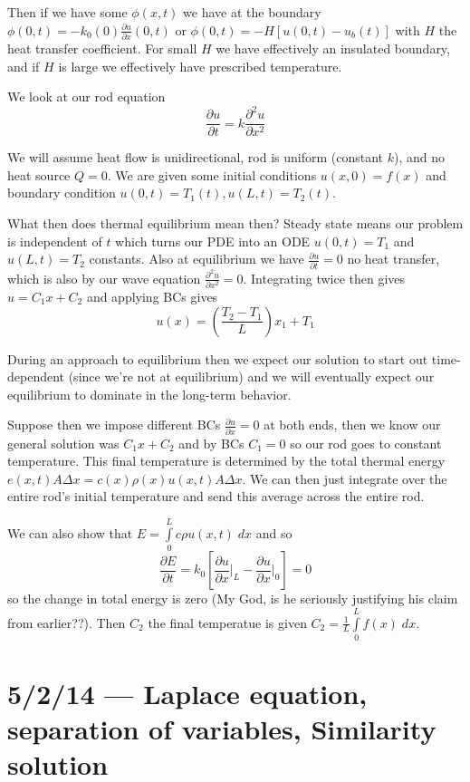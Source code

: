 \documentclass[10pt]{report}
\newcommand{\ptd}[2]{\frac{\partial^2 #1}{\partial#2^2}}
\newcommand{\pd}[2]{\frac{\partial #1}{\partial#2}}
\begin{document}
Then if we have some $\phi(x,t)$ we have at the boundary $\phi(0,t) = -k_0(0) \pd{u}{x}(0,t)$ or $\phi(0,t) = -H\left[ u(0,t) - u_b(t) \right]$ with $H$ the heat transfer coefficient. For small $H$ we have effectively an insulated boundary, and if $H$ is large we effectively have prescribed temperature. 

We look at our rod equation
\begin{equation}
    \pd{u}{t} = k\ptd{u}{x}
\end{equation}

We will assume heat flow is unidirectional, rod is uniform (constant $k$), and no heat source $Q = 0$. We are given some initial conditions $u(x,0) = f(x)$ and boundary condition $u(0,t) = T_1(t), u(L,t) = T_2(t)$.

What then does thermal equilibrium mean then? Steady state means our problem is independent of $t$ which turns our PDE into an ODE $u(0,t) = T_1$ and $u(L,t) = T_2$ constants. Also at equilibrium we have $\pd{u}{t} = 0$ no heat transfer, which is also by our wave equation $\ptd{u}{x} = 0$. Integrating twice then gives $u = C_1x + C_2$ and applying BCs gives 
\begin{equation}
    u(x) = \left( \frac{T_2 - T_1}{L} \right)x_1 + T_1
\end{equation}

During an approach to equilibrium then we expect our solution to start out time-dependent (since we're not at equilibrium) and we will eventually expect our equilibrium to dominate in the long-term behavior.

Suppose then we impose different BCs $\pd{u}{x} = 0$ at both ends, then we know our general solution was $C_1x + C_2$ and by BCs $C_1 = 0$ so our rod goes to constant temperature. This final temperature is determined by the total thermal energy $e(x,t)A\Delta x = c(x)\rho(x)u(x,t) A\Delta x$. We can then just integrate over the entire rod's initial temperature and send this average across the entire rod. 

We can also show that $E = \int\limits_{0}^{L}c\rho u(x,t)\;dx$ and so
\begin{equation}
    \pd{E}{t} = k_0\left[\pd{u}{x}\Big|_L - \pd{u}{x}\Big|_0\right] = 0
\end{equation}
so the change in total energy is zero (My God, is he seriously justifying his claim from earlier??). Then $C_2$ the final temperatue is given $C_2 = \frac{1}{L}\int\limits_{0}^{L}f(x)\;dx$. 
\chapter{5/2/14 --- Laplace equation, separation of variables, Similarity solution}
\end{document}
